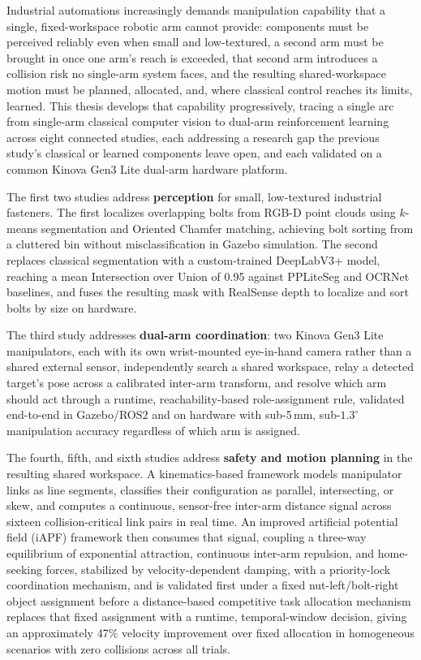 \begin{Abstract}
Industrial automations increasingly demands manipulation capability that a single, fixed-workspace
robotic arm cannot provide: components must be perceived reliably even when small and
low-textured, a second arm must be brought in once one arm's reach is exceeded, that second arm
introduces a collision risk no single-arm system faces, and the resulting shared-workspace motion
must be planned, allocated, and, where classical control reaches its limits, learned. This thesis
develops that capability progressively, tracing a single arc from single-arm classical computer
vision to dual-arm reinforcement learning across eight connected studies, each addressing a
research gap the previous study's classical or learned components leave open, and each validated on
a common Kinova Gen3 Lite dual-arm hardware platform.

The first two studies address \textbf{perception} for small, low-textured industrial fasteners.
The first localizes overlapping bolts from RGB-D point clouds using $k$-means segmentation and
Oriented Chamfer matching, achieving bolt sorting from a cluttered bin without misclassification in
Gazebo simulation. The second replaces classical segmentation with a custom-trained DeepLabV3+
model, reaching a mean Intersection over Union of 0.95 against PPLiteSeg and OCRNet baselines, and
fuses the resulting mask with RealSense depth to localize and sort bolts by size on hardware.

The third study addresses \textbf{dual-arm coordination}: two Kinova Gen3 Lite manipulators, each
with its own wrist-mounted eye-in-hand camera rather than a shared external sensor, independently
search a shared workspace, relay a detected target's pose across a calibrated inter-arm transform,
and resolve which arm should act through a runtime, reachability-based role-assignment rule,
validated end-to-end in Gazebo/ROS2 and on hardware with sub-5\,mm, sub-$1.3^\circ$ manipulation
accuracy regardless of which arm is assigned.

The fourth, fifth, and sixth studies address \textbf{safety and motion planning} in the resulting
shared workspace. A kinematics-based framework models manipulator links as line segments,
classifies their configuration as parallel, intersecting, or skew, and computes a continuous,
sensor-free inter-arm distance signal across sixteen collision-critical link pairs in real time.
An improved artificial potential field (iAPF) framework then consumes that signal, coupling a
three-way equilibrium of exponential attraction, continuous inter-arm repulsion, and home-seeking
forces, stabilized by velocity-dependent damping, with a priority-lock coordination mechanism,
and is validated first under a fixed nut-left/bolt-right
object assignment before a distance-based competitive task allocation mechanism replaces that fixed
assignment with a runtime, temporal-window decision, giving an approximately 47\% velocity
improvement over fixed allocation in homogeneous scenarios with zero collisions across all trials.


\end{Abstract}
